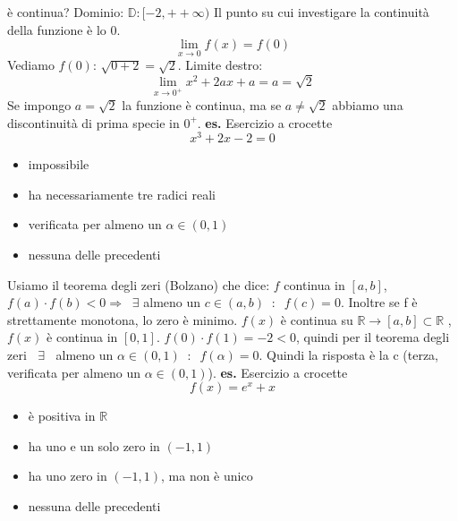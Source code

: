 è continua?
\newline
Dominio: $\mathbb{D} : [-2,+ +\infty)$
\newline
Il punto su cui investigare la continuità della funzione è lo $0$.
\[
    \lim_{x\rightarrow 0} f(x) = f(0)
\]
Vediamo $f(0)$: $\sqrt{0+2} = \sqrt{2}$.
\newline
Limite destro:
\[
    \lim_{x\rightarrow 0^+} x^2 + 2ax +a = a = \sqrt{2}
\]
Se impongo $a= \sqrt{2}$ la funzione è continua, ma se $a \neq \sqrt{2}$ abbiamo una discontinuità di prima specie in $0^+$.
\newline
\newline
\newline
\textbf{es.} Esercizio a crocette
\[
    x^3 +2x -2 = 0
\]
\begin{itemize}
    \item impossibile
    \item ha necessariamente tre radici reali
    \item verificata per almeno un $\alpha \in (0,1)$
    \item nessuna delle precedenti
\end{itemize}
Usiamo il teorema degli zeri (Bolzano) che dice:
\newline
$f$ continua in $[a,b]$, $f(a) \cdot f(b) < 0 \Rightarrow  \;\;\exists$ almeno un $c \in(a,b) \;\;:\;\; f(c) = 0$. Inoltre se f è strettamente monotona, lo zero è minimo.
\newline
\newline
$f(x)$ è continua su $\mathbb{R} \rightarrow  [a,b] \subset \mathbb{R}$ , $f(x)$ è continua in $[0,1]$.
\newline
$f(0) \cdot f(1) = -2 <0$, quindi per il teorema degli zeri $\;\;\exists\;\;$ almeno un $\alpha \in(0,1) \;\;:\;\; f(\alpha) = 0$.
\newline
Quindi la risposta è la c (terza, verificata per almeno un $\alpha \in (0,1)$).
\newline
\newline
\newline
\textbf{es.} Esercizio a crocette
\[
    f(x) = e^x +x
\]
\begin{itemize}
    \item è positiva in $\mathbb{R}$
    \item ha uno e un solo zero in $(-1,1)$
    \item ha uno zero in $(-1,1)$, ma non è unico
    \item nessuna delle precedenti
\end{itemize}
